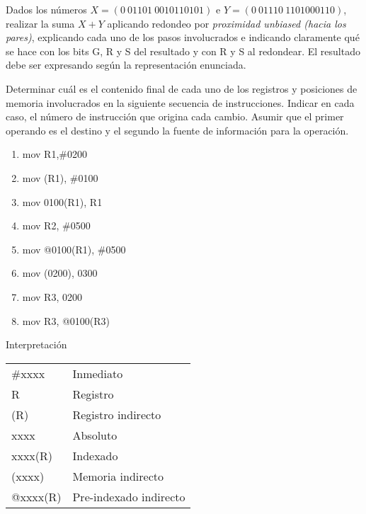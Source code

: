 \documentclass[12pt,a4paper]{article}
\begin{document}
Dados los números $X = (0 \ 01101 \ 0010110101)$ e $Y = (0 \ 01110 \ 1101000110)$, realizar la suma $X + Y$ aplicando redondeo por \textit{proximidad unbiased (hacia los pares)}, explicando cada uno de los pasos involucrados e indicando claramente qué se hace con los bits G, R y S del resultado y con R y S al redondear. El resultado debe ser expresando según la representación enunciada.

 Determinar cuál es el contenido final de cada uno de los registros y posiciones de memoria involucrados en la siguiente secuencia de instrucciones. Indicar en cada caso, el número de instrucción que origina cada cambio. Asumir que el primer operando es el destino y el segundo la fuente de información para la operación.
\begin{center}
	\begin{minipage}{0.4\textwidth}
		\begin{enumerate}[(1)]
			\itemsep -5pt
			\item mov R1,\#0200
			\item mov (R1), \#0100
			\item mov 0100(R1), R1
			\item mov R2, \#0500
			\item mov @0100(R1), \#0500
			\item mov (0200), 0300
			\item mov R3, 0200
			\item mov R3, @0100(R3)
		\end{enumerate}
	\end{minipage}
	\begin{minipage}{0.4\textwidth}
		Interpretación
		\begin{tabular}{ll}
			\#xxxx   & Inmediato\\
			R       & Registro \\
			(R)     & Registro indirecto\\
			xxxx    & Absoluto \\
			xxxx(R) & Indexado \\
			(xxxx)  & Memoria indirecto\\
			@xxxx(R) & Pre-indexado indirecto
		\end{tabular}
	\end{minipage}
\end{center}
\end{document}
